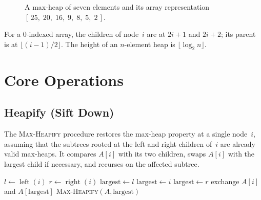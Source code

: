\documentclass[11pt, a4paper, notitlepage]{report}
\theoremstyle{definition}
\theoremstyle{remark}
\theoremstyle{definition}
\begin{document}
\begin{figure}[h]
\centering
{}
\caption{A max-heap of seven elements and its array representation
         $[\,25,\;20,\;16,\;9,\;8,\;5,\;2\,]$.}
\label{fig:max-heap}
\end{figure}

\begin{keyresult}[title={Key Result: Heap Index Formulas}]
For a 0-indexed array, the children of node~$i$ are at $2i+1$ and $2i+2$;
its parent is at $\lfloor(i-1)/2\rfloor$.  The height of an $n$-element heap
is $\lfloor\log_2 n\rfloor$.
\end{keyresult}

\section{Core Operations}
\label{sec:heap-ops}

\subsection{Heapify (Sift Down)}
\label{subsec:heapify}

The \textsc{Max-Heapify} procedure restores the max-heap property at a single node~$i$, assuming that the subtrees rooted at the left and right children of~$i$ are already valid max-heaps.  It compares $A[i]$ with its two children, swaps $A[i]$ with the largest child if necessary, and recurses on the affected subtree.

\begin{algorithm}[h]
\caption{\textsc{Max-Heapify}$(A, i)$}
\label{alg:max-heapify}
\begin{algorithmic}[1]
\State $l \gets \operatorname{left}(i)$
\State $r \gets \operatorname{right}(i)$
    \State $\text{largest} \gets l$
\Else
    \State $\text{largest} \gets i$
\EndIf
{}
    \State $\text{largest} \gets r$
\EndIf
{}
    \State exchange $A[i]$ and $A[\text{largest}]$
    \State \textsc{Max-Heapify}$(A, \text{largest})$
\EndIf
\end{algorithmic}
\end{algorithm}
\end{document}
